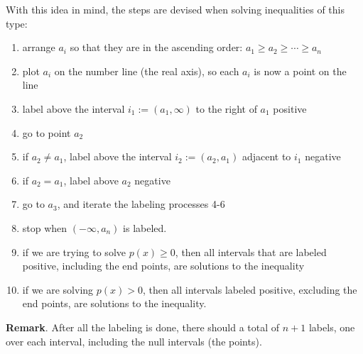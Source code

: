 \documentclass[12pt]{article}
\begin{document}
With this idea in mind, the steps are devised when solving inequalities of this type:
\begin{enumerate}
\item arrange $a_i$ so that they are in the ascending order: $a_1\ge a_2\ge \cdots \ge a_n$
\item plot $a_i$ on the number line (the real axis), so each $a_i$ is now a point on the line
\item label above the interval $i_1:=(a_1,\infty)$ to the right of $a_1$ positive
\item go to point $a_2$
\item if $a_2\ne a_1$, label above the interval $i_2:=(a_2,a_1)$ adjacent to $i_1$ negative
\item if $a_2=a_1$, label above $a_2$ negative
\item go to $a_3$, and iterate the labeling processes 4-6
\item stop when $(-\infty,a_n)$ is labeled.
\item if we are trying to solve $p(x)\ge 0$, then all intervals that are labeled positive, including the end points, are solutions to the inequality
\item if we are solving $p(x)>0$, then all intervals labeled positive, excluding the end points, are solutions to the inequality.
\end{enumerate}

\textbf{Remark}.  After all the labeling is done, there should a total of $n+1$ labels, one over each interval, including the null intervals (the points).
\end{document}
